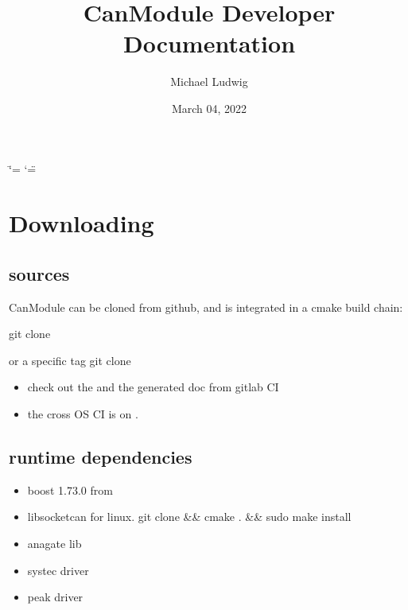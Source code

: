 \documentclass[a4paper,10pt,english]{sphinxmanual}
\title{CanModule Developer Documentation}
\date{March 04, 2022}
\author{Michael Ludwig}
\begin{document}
\ifdefined\shorthandoff
  \ifnum\catcode`\=\string=\active\shorthandoff{=}\fi
  \ifnum\catcode`\"=\active{}\fi
\fi

\pagestyle{empty}
\sphinxmaketitle
\pagestyle{plain}
\sphinxtableofcontents
\pagestyle{normal}
\label{\detokenize{index::doc}}



\chapter{Downloading}
\label{\detokenize{downloading:downloading}}\label{\detokenize{downloading::doc}}

\section{sources}
\label{\detokenize{downloading:sources}}
\sphinxAtStartPar
CanModule can be cloned from github, and is integrated in a cmake build chain:

\sphinxAtStartPar
git clone 

\sphinxAtStartPar
or a specific tag
git clone  
\begin{itemize}
\item {} 
\sphinxAtStartPar
check out the  and the generated doc from gitlab CI

\item {} 
\sphinxAtStartPar
the cross OS CI is on  .

\end{itemize}


\section{runtime dependencies}
\label{\detokenize{downloading:runtime-dependencies}}\begin{itemize}
\item {} 
\sphinxAtStartPar
boost 1.73.0 from 

\item {} 
\sphinxAtStartPar
libsocketcan for linux.
git clone  \&\& cmake . \&\& sudo make install

\item {} 
\sphinxAtStartPar
anagate lib

\item {} 
\sphinxAtStartPar
systec driver

\item {} 
\sphinxAtStartPar
peak driver

\end{itemize}
\end{document}
